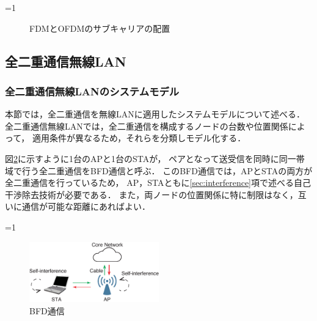 \documentclass[master]{kuisthesis}		%
\newcounter{flagFig}
\begin{document}
			\ifnum\value{flagFig}=1 {\begin{figure}[htbp]
				\centering
				\hspace{20pt}
				\caption{FDMとOFDMのサブキャリアの配置}
				\label{fig:ofdm_ofdma}
			\end{figure}}\fi
	\subsection{全二重通信無線LAN}
		\subsubsection{全二重通信無線LANのシステムモデル}
			本節では，全二重通信を無線LANに適用したシステムモデルについて述べる．
			全二重通信無線LANでは，全二重通信を構成するノードの台数や位置関係によって，
			適用条件が異なるため，それらを分類しモデル化する．
			\par
			図\ref{fig:model_pair}に示すように1台のAPと1台のSTAが，
			ペアとなって送受信を同時に同一帯域で行う全二重通信をBFD通信と呼ぶ．
			このBFD通信では，APとSTAの両方が全二重通信を行っているため，
			AP，STAともに\ref{sec:interference}項で述べる自己干渉除去技術が必要である．
			また，両ノードの位置関係に特に制限はなく，互いに通信が可能な距離にあればよい．

			\ifnum\value{flagFig}=1 {\begin{figure}[htbp]
				\begin{center}
					\includegraphics[width=0.5\textwidth]{fig/bfd.eps}
					\caption{BFD通信}
					\label{fig:model_pair}
				\end{center}
			\end{figure}}\fi
\end{document}
